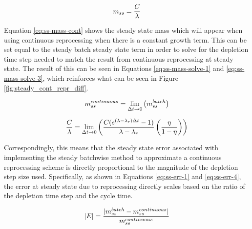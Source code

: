 \begin{equation} \hfill
m_{ss} = \frac{C}{\lambda}
\hfill\label{eq:ss-mass-cont} \end{equation}

Equation \eqref{eq:ss-mass-cont} shows the steady state mass which will appear when using continuous reprocessing when there is a constant growth term. This can be set equal to the steady batch steady state term in order to solve for the depletion time step needed to match the result from continuous reprocessing at steady state. The result of this can be seen in Equations \eqref{eq:ss-mass-solve-1} and \eqref{eq:ss-mass-solve-3}, which reinforces what can be seen in Figure \ref{fig:steady_cont_repr_diff}.

\begin{equation} \hfill
m_{ss}^{continuous} = \lim_{\Delta t \to 0} \left( m_{ss}^{batch} \right)
\hfill\label{eq:ss-mass-solve-1} \end{equation}

\begin{equation} \hfill
\frac{C}{\lambda} = \lim_{\Delta t \to 0} \left( \frac{C (e^{(\lambda - \lambda_r) \Delta t} - 1)}{\lambda - \lambda_r}  \left( \frac{\eta}{1 - \eta} \right) \right)
\hfill\label{eq:ss-mass-solve-3} \end{equation}

Correspondingly, this means that the steady state error associated with implementing the steady batchwise method to approximate a continuous reprocessing scheme is directly proportional to the magnitude of the depletion step size used. Specifically, as shown in Equations \eqref{eq:ss-err-1} and \eqref{eq:ss-err-4}, the error at steady state due to reprocessing directly scales based on the ratio of the depletion time step and the cycle time.

\begin{equation} \hfill
|E| = \frac{|m_{ss}^{batch} - m_{ss}^{continuous}|}{m_{ss}^{continuous}}
\hfill\label{eq:ss-err-1} \end{equation}



